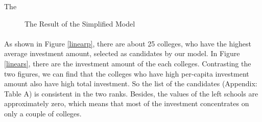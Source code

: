 \documentclass{mcmthesis}
\begin{document}
The 
\begin{figure} [H]
\centering
\begin{minipage}{\textwidth}
\end{minipage}
\caption{The Result of the Simplified Model}
\end{figure}

\paragraph{} As shown in Figure \ref{linearp}, there are about 25 colleges, who have the highest average investment amount, selected as candidates by our model. In Figure \ref{linears}, there are the investment amount of the each colleges. Contrasting the two figures, we can find that the colleges who have high per-capita investment amount also have high total investment. So the list of the candidates (Appendix: Table A) is consistent in the two ranks. Besides, the values of the left schools are approximately zero, which means that most of the investment concentrates on only a couple of colleges. 
\end{document}
